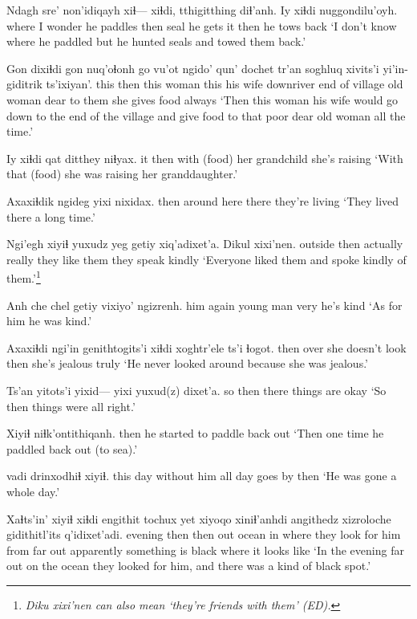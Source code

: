 \documentclass[12pt]{article}
\begin{document}
\gll Ndagh sre' non'idiqayh xiɬ--- xiɬdi, tthigitthing diɬ'anh. Iy xiɬdi nuggondilu'oyh. 
where {I wonder} {he paddles} {} then seal {he gets} it then {he tows back}
\glt `I don't know where he paddled but he hunted seals and towed them back.' 
\glend

\gll Gon dixiɬdi gon nuq'oɬonh go vu'ot ngido' {qun' dochet} tr'an soghluq xivits'i yi'in-giditrik ts'ixiyan'.
this then this woman this {his wife} downriver {end of village} {old woman} dear {to them} {she gives food} always
\glt `Then this woman his wife would go down to the end of the village and give food to that poor dear old woman all the time.' 
\glend

\gll Iy xiɬdi qat ditthey niɬyax.
it then   {with (food)}  {her grandchild} {she's raising} 
\glt `With that (food) she was raising her granddaughter.' 
\glend

\gll Axaxiɬdik ngideg yixi nixidax. 
then {around here} there {they're living}
\glt `They lived there a long time.' 
\glend

\gll Ngi'egh xiyiɬ {yuxudz yeg} getiy xiq'adixet'a. {Dikul xixi'nen}. 
outside then actually really  {they like them} {they speak kindly}
\glt `Everyone liked them and spoke kindly of them.'\footnote{\em Diku xixi'nen \em can also mean `they're friends with them' (ED).}
\glend

\gll Anh che chel getiy {vixiyo' ngizrenh.} 
him again {young man} very {he's kind}
\glt `As for him he was kind.'
\glend

\gll Axaxiɬdi ngi'in {genithtogits'i} xiɬdi xoghtr'ele ts'i {ɬogot}. 
then      over {she doesn't look} then {she's jealous} {} truly
\glt `He never looked around because she was jealous.' 
\glend

\gll Ts'an yitots'i yixid--- yixi {yuxud(z) dixet'a.} 
so    then       {} there  {things are okay}
\glt `So then things were all right.' 
\glend

\gll Xiyiɬ niɬk'ontithiqanh. 
then  {he started to paddle back out}
\glt `Then one time he paddled back out (to sea).' 
\glend

 vadi drinxodhiɬ xiyiɬ. 
{this day} {without him} {all day goes by} then 
\glt `He was gone a whole day.'
\glend

\gll Xaɬts'in' xiyiɬ xiɬdi engithit tochux yet {xiyoqo xiniɬ'anhdi} angithedz xizroloche gidithitl'its q'idixet'adi. 
evening then then out ocean in {where they look for him} {from far out} apparently {something is black} {where it looks like}
\glt  `In the evening far out on the ocean they looked for him, and there was a kind of black spot.' 
\glend
\end{document}
